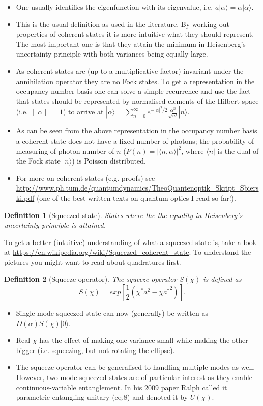 \documentclass[11pt]{report}
\newtheorem{definition}{Definition}[chapter]
\begin{document}
\begin{itemize}
	\item One usually identifies the eigenfunction with its eigenvalue, i.e. $a|\alpha\rangle = \alpha|\alpha\rangle$.
	\item This is the usual definition as used in the literature. By working out properties of coherent states it is more intuitive what they should represent. The most important one is that they attain the minimum in Heisenberg's uncertainty principle with both variances being equally large.
	\item As coherent states are (up to a multiplicative factor) invariant under the annihilation operator they are no Fock states. To get a representation in the occupancy number basis one can solve a simple recurrence and use the fact that states should be represented by normalised elements of the Hilbert space (i.e. $\|\alpha\|=1$) to arrive at $|\alpha\rangle = \sum_{n=0}^\infty e^{-|\alpha|^2/2}\frac{\alpha^n}{\sqrt{n!}}|n\rangle$.
	\item As can be seen from the above representation in the occupancy number basis a coherent state does not have a fixed number of photons; the probability of measuring of photon number of $n$ ($P(n) = |\langle n, \alpha\rangle|^2$, where $\langle n|$ is the dual of the Fock state $|n\rangle$) is Poisson distributed.
	\item For more on coherent states (e.g. proofs) see \url{http://www.ph.tum.de/quantumdynamics/TheoQuantenoptik_Skript_Sbierski.pdf} (one of the best written texts on quantum optics I read so far!).
\end{itemize}

\begin{definition}[Squeezed state]
	States where the the equality in Heisenberg's uncertainty principle is attained.
\end{definition}

To get a better (intuitive) understanding of what a squeezed state is, take a look at \url{https://en.wikipedia.org/wiki/Squeezed_coherent_state}. To understand the pictures you might want to read about quadratures first.

\begin{definition}[Squeeze operator]
	The squeeze operator $S(\chi)$ is defined as $$S(\chi) = exp[\frac{1}{2}(\chi^*a^2 - \chi {a^\dagger}^2)].$$
\end{definition}

\begin{itemize}
	\item Single mode squeezed state can now (generally) be written as $D(\alpha)S(\chi)|0\rangle$.
	\item Real $\chi$ has the effect of making one variance small while making the other bigger (i.e. squeezing, but not rotating the ellipse).
	\item The squeeze operator can be generalised to handling multiple modes as well. However, two-mode squeezed states are of particular interest as they enable continuous-variable entanglement. In his 2009 paper Ralph called it parametric entangling unitary (eq.8) and denoted it by $U(\chi)$.
\end{itemize}
\end{document}
